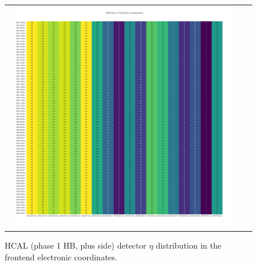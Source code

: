 \begin{figure}[htb]
 \begin{center}
  \begin{tabular}{cc}
   \includegraphics[angle=0,width=0.95\textwidth]{figures/appendix/HBP_Eta_in_FrontEnd.png}
  \end{tabular}
	\caption{HCAL (phase 1 HB, plus side) detector $\eta$ distribution in the frontend electronic coordinates.}
  \label{fig:lmapHBPEtaFEC}
 \end{center}
\end{figure}
\clearpage

